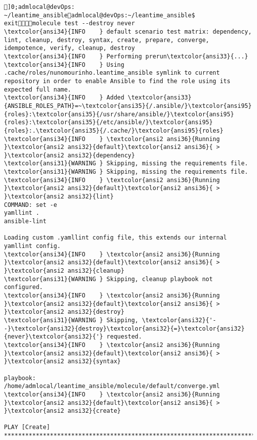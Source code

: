 \documentclass{scrartcl}
\title{}
\begin{document}
\begin{Verbatim}
]0;admlocal@devOps: ~/leantime_ansibleadmlocal@devOps:~/leantime_ansible$ exitmolecule test --destroy never
\textcolor{ansi34}{INFO    } default scenario test matrix: dependency, lint, cleanup, destroy, syntax, create, prepare, converge, idempotence, verify, cleanup, destroy
\textcolor{ansi34}{INFO    } Performing prerun\textcolor{ansi33}{...}
\textcolor{ansi34}{INFO    } Using .cache/roles/nunomourinho.leantime_ansible symlink to current repository in order to enable Ansible to find the role using its expected full name.
\textcolor{ansi34}{INFO    } Added \textcolor{ansi33}{ANSIBLE_ROLES_PATH}=~\textcolor{ansi35}{/.ansible/}\textcolor{ansi95}{roles}:\textcolor{ansi35}{/usr/share/ansible/}\textcolor{ansi95}{roles}:\textcolor{ansi35}{/etc/ansible/}\textcolor{ansi95}{roles}:.\textcolor{ansi35}{/.cache/}\textcolor{ansi95}{roles}
\textcolor{ansi34}{INFO    } \textcolor{ansi2 ansi36}{Running }\textcolor{ansi2 ansi32}{default}\textcolor{ansi2 ansi36}{ > }\textcolor{ansi2 ansi32}{dependency}
\textcolor{ansi31}{WARNING } Skipping, missing the requirements file.
\textcolor{ansi31}{WARNING } Skipping, missing the requirements file.
\textcolor{ansi34}{INFO    } \textcolor{ansi2 ansi36}{Running }\textcolor{ansi2 ansi32}{default}\textcolor{ansi2 ansi36}{ > }\textcolor{ansi2 ansi32}{lint}
COMMAND: set -e
yamllint .
ansible-lint

Loading custom .yamllint config file, this extends our internal yamllint config.
\textcolor{ansi34}{INFO    } \textcolor{ansi2 ansi36}{Running }\textcolor{ansi2 ansi32}{default}\textcolor{ansi2 ansi36}{ > }\textcolor{ansi2 ansi32}{cleanup}
\textcolor{ansi31}{WARNING } Skipping, cleanup playbook not configured.
\textcolor{ansi34}{INFO    } \textcolor{ansi2 ansi36}{Running }\textcolor{ansi2 ansi32}{default}\textcolor{ansi2 ansi36}{ > }\textcolor{ansi2 ansi32}{destroy}
\textcolor{ansi31}{WARNING } Skipping, \textcolor{ansi32}{'--}\textcolor{ansi32}{destroy}\textcolor{ansi32}{=}\textcolor{ansi32}{never}\textcolor{ansi32}{'} requested.
\textcolor{ansi34}{INFO    } \textcolor{ansi2 ansi36}{Running }\textcolor{ansi2 ansi32}{default}\textcolor{ansi2 ansi36}{ > }\textcolor{ansi2 ansi32}{syntax}

playbook: /home/admlocal/leantime_ansible/molecule/default/converge.yml
\textcolor{ansi34}{INFO    } \textcolor{ansi2 ansi36}{Running }\textcolor{ansi2 ansi32}{default}\textcolor{ansi2 ansi36}{ > }\textcolor{ansi2 ansi32}{create}

PLAY [Create] ****************************************************************************************************************************


\end{Verbatim}
\end{document}
